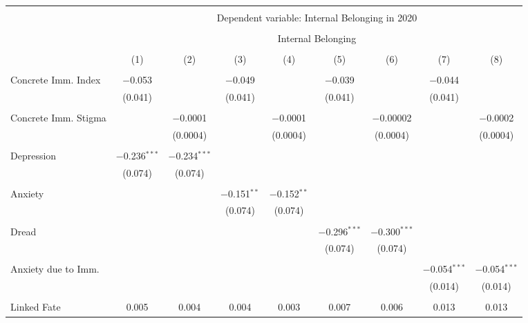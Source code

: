 
\begin{table}[!htbp] \centering 
  \caption{} 
  \label{} 
\begin{tabular}{@{\extracolsep{5pt}}lcccccccc} 
\\[-1.8ex]\hline 
\hline \\[-1.8ex] 
 & \multicolumn{8}{c}{Dependent variable: Internal Belonging in 2020} \\ 
\cline{2-9} 
\\[-1.8ex] & \multicolumn{8}{c}{Internal Belonging} \\ 
\\[-1.8ex] & (1) & (2) & (3) & (4) & (5) & (6) & (7) & (8)\\ 
\hline \\[-1.8ex] 
 Concrete Imm. Index & $-$0.053 &  & $-$0.049 &  & $-$0.039 &  & $-$0.044 &  \\ 
  & (0.041) &  & (0.041) &  & (0.041) &  & (0.041) &  \\ 
  & & & & & & & & \\ 
 Concrete Imm. Stigma &  & $-$0.0001 &  & $-$0.0001 &  & $-$0.00002 &  & $-$0.0002 \\ 
  &  & (0.0004) &  & (0.0004) &  & (0.0004) &  & (0.0004) \\ 
  & & & & & & & & \\ 
 Depression & $-$0.236$^{***}$ & $-$0.234$^{***}$ &  &  &  &  &  &  \\ 
  & (0.074) & (0.074) &  &  &  &  &  &  \\ 
  & & & & & & & & \\ 
 Anxiety &  &  & $-$0.151$^{**}$ & $-$0.152$^{**}$ &  &  &  &  \\ 
  &  &  & (0.074) & (0.074) &  &  &  &  \\ 
  & & & & & & & & \\ 
 Dread &  &  &  &  & $-$0.296$^{***}$ & $-$0.300$^{***}$ &  &  \\ 
  &  &  &  &  & (0.074) & (0.074) &  &  \\ 
  & & & & & & & & \\ 
 Anxiety due to Imm. &  &  &  &  &  &  & $-$0.054$^{***}$ & $-$0.054$^{***}$ \\ 
  &  &  &  &  &  &  & (0.014) & (0.014) \\ 
  & & & & & & & & \\ 
 Linked Fate & 0.005 & 0.004 & 0.004 & 0.003 & 0.007 & 0.006 & 0.013 & 0.013 \\ 

\end{tabular}
\end{table}
